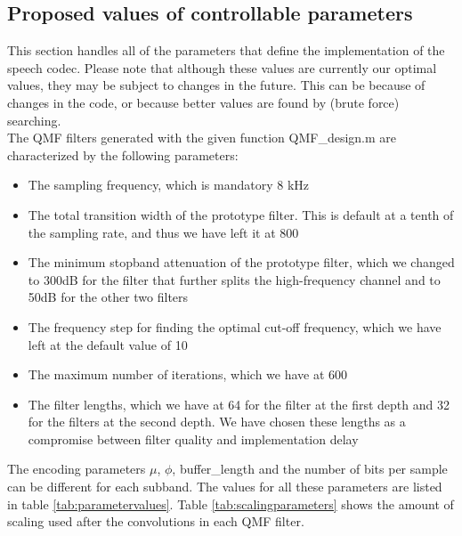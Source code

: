 \documentclass[a4paper]{article}
\begin{document}
\subsection{Proposed values of controllable parameters}
This section handles all of the parameters that define the implementation of the speech codec. Please note that although these values are currently our optimal values, they may be subject to changes in the future. This can be because of changes in the code, or because better values are found by (brute force) searching.\\

The QMF filters generated with the given function QMF\_design.m are characterized by the following parameters:

\begin{itemize}
\item The sampling frequency, which is mandatory 8 kHz
\item The total transition width of the prototype filter. This is default at a tenth of the sampling rate, and thus we have left it at 800
\item The minimum stopband attenuation of the prototype filter, which we changed to 300dB for the filter that further splits the high-frequency channel and to 50dB for the other two filters
\item The frequency step for finding the optimal cut-off frequency, which we have left at the default value of 10
\item The maximum number of iterations, which we have at 600
\item The filter lengths, which we have at 64 for the filter at the first depth and 32 for the filters at the second depth. We have chosen these lengths as a compromise between filter quality and implementation delay
\
\end{itemize}

The encoding parameters $\mu$, $\phi$, buffer\_length and the number of bits per sample can be different for each subband. The values for all these parameters are listed in table \ref{tab:parametervalues}. Table \ref{tab:scalingparameters} shows the amount of scaling used after the convolutions in each QMF filter.
\end{document}
